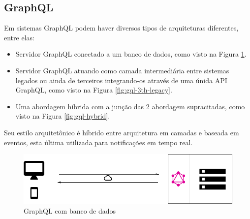 \subsection{GraphQL}\label{graphql}

Em sistemas GraphQL podem haver diversos tipos de arquiteturas
diferentes, entre elas:

\begin{itemize}
\itemsep1pt\parskip0pt
\item
  Servidor GraphQL conectado a um banco de dados, como visto na Figura
  \ref{fig:gql-dbgql-db}.
\item
  Servidor GraphQL atuando como camada intermediária entre sistemas
  legados ou ainda de terceiros integrando-os através de uma únida API
  GraphQL, como visto na Figura \ref{fig:gql-3th-legacy}.
\item
  Uma abordagem híbrida com a junção das 2 abordagem supracitadas, como
  visto na Figura \ref{fig:gql-hybrid}.
\end{itemize}

Seu estilo arquitetônico é híbrido entre arquitetura em camadas e
baseada em eventos, esta última utilizada para notificações em tempo
real.

\begin{figure}[h]
    \centering
    \includegraphics[scale=0.25]{img/gql-db.png}
    \caption{GraphQL com banco de dados}
    \label{fig:gql-dbgql-db}
\end{figure}

